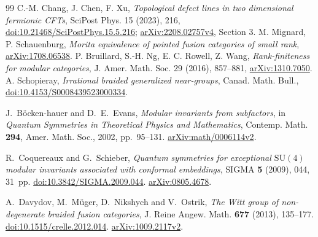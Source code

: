 \documentclass[11pt]{article}
\providecommand{\SU}{\mathrm{SU}}
\theoremstyle{remark}\newtheorem{remark}[proposition]{Remark}
\begin{document}
\begin{thebibliography}{99}
 C.-M. Chang, J. Chen, F. Xu,
\emph{Topological defect lines in two dimensional fermionic CFTs},
SciPost Phys. 15 (2023), 216,
\href{https://doi.org/10.21468/SciPostPhys.15.5.216}{doi:10.21468/SciPostPhys.15.5.216};
\href{https://arxiv.org/abs/2208.02757v4}{arXiv:2208.02757v4}, Section 3.
 M. Mignard, P. Schauenburg,
\emph{Morita equivalence of pointed fusion categories of small rank},
\href{https://arxiv.org/abs/1708.06538}{arXiv:1708.06538}.
 P. Bruillard, S.-H. Ng, E. C. Rowell, Z. Wang,
\emph{Rank-finiteness for modular categories}, J. Amer. Math. Soc. 29 (2016),
857--881, \href{https://arxiv.org/abs/1310.7050}{arXiv:1310.7050}.
 A. Schopieray,
\emph{Irrational braided generalized near-groups},
Canad. Math. Bull., \href{https://doi.org/10.4153/S0008439523000334}{doi:10.4153/S0008439523000334}.

J.~B\"ocken-hauer and D.~E.~Evans,
\emph{Modular invariants from subfactors},
in \emph{Quantum Symmetries in Theoretical Physics and Mathematics},
Contemp. Math. \textbf{294}, Amer. Math. Soc., 2002, pp.~95--131.
\href{https://arxiv.org/abs/math/0006114}{arXiv:math/0006114v2}.

R.~Coquereaux and G.~Schieber,
\emph{Quantum symmetries for exceptional $\SU(4)$ modular invariants
associated with conformal embeddings},
SIGMA \textbf{5} (2009), 044, 31~pp.
\href{https://doi.org/10.3842/SIGMA.2009.044}{doi:10.3842/SIGMA.2009.044}.
\href{https://arxiv.org/abs/0805.4678}{arXiv:0805.4678}.

A.~Davydov, M.~M\"uger, D.~Nikshych and V.~Ostrik,
\emph{The Witt group of non-degenerate braided fusion categories},
J. Reine Angew. Math. \textbf{677} (2013), 135--177.
\href{https://doi.org/10.1515/crelle.2012.014}{doi:10.1515/crelle.2012.014}.
\href{https://arxiv.org/abs/1009.2117}{arXiv:1009.2117v2}.


\end{thebibliography}
\end{document}
